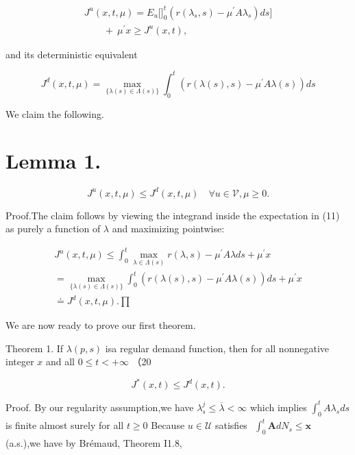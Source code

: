 \[
\begin{array} { l } { { J ^ { u } ( x , t , \mu ) = E _ { u } \Bigg [ \Bigg ] _ { 0 } ^ { t } \left( r ( \lambda _ { s } , s ) - \mu ^ { \prime } A \lambda _ { s } \right) d s \Bigg ] } } \\ { { \quad \quad + \ \mu ^ { \prime } x \geqslant J ^ { u } ( x , t ) , } } \end{array}
\]

and its deterministic equivalent

\[
J ^ { d } ( x , t , \mu ) = \operatorname* { m a x } _ { \{ \lambda ( s ) \in \Lambda ( s ) \} } \int _ { 0 } ^ { t } \left( r ( \lambda ( s ) , s ) - \mu ^ { \prime } A \lambda ( s ) \right) d s
\]

We claim the following.

\section{Lemma 1.}\label{lemma-1.}

\[
J ^ { u } ( x , t , \mu ) \leqslant J ^ { d } ( x , t , \mu ) \quad \forall u \in \mathcal { V } , \mu \geqslant 0 .
\]

Proof.The claim follows by viewing the integrand inside the expectation
in (11) as purely a function of \(\lambda\) and maximizing pointwise:

\[
\begin{array} { l } { \displaystyle { J ^ { u } ( x , t , \mu ) \leqslant \int _ { 0 } ^ { t } \underset { \lambda \in \Lambda ( s ) } { \operatorname* { m a x } } \left. r ( \lambda , s ) - \mu ^ { \prime } A \lambda \right. d s + \mu ^ { \prime } x } } \\ { \displaystyle { = \underset { \{ \lambda ( s ) \in \Lambda ( s ) \} } { \operatorname* { m a x } } \int _ { 0 } ^ { t } \left( r ( \lambda ( s ) , s ) - \mu ^ { \prime } A \lambda ( s ) \right) d s + \mu ^ { \prime } x } } \\ { \displaystyle { \doteq J ^ { d } ( x , t , \mu ) . } \prod } \end{array}
\]

We are now ready to prove our first theorem.

Theorem 1. If \(\lambda ( p , s )\) isa regular demand function, then
for all nonnegative integer \(x\) and all \(0 \leqslant t < + \infty\)
（20

\[
J ^ { * } ( x , t ) \leqslant J ^ { d } ( x , t ) .
\]

Proof. By our regularity assumption,we have
\(\lambda _ { s } ^ { j } \leqslant \overline { { \lambda } } < \infty\)
which implies \(\textstyle \int _ { 0 } ^ { t } A \lambda _ { s } d s\)
is finite almost surely for all \(t \geq 0\) Because
\(u \in \mathcal { U }\) satisfies
\(\begin{array} { r } { \int _ { 0 } ^ { t } \boldsymbol { A } d N _ { s } \leqslant \boldsymbol { x } } \end{array}\)
(a.s.),we have by Brémaud, Theorem I1.8,

